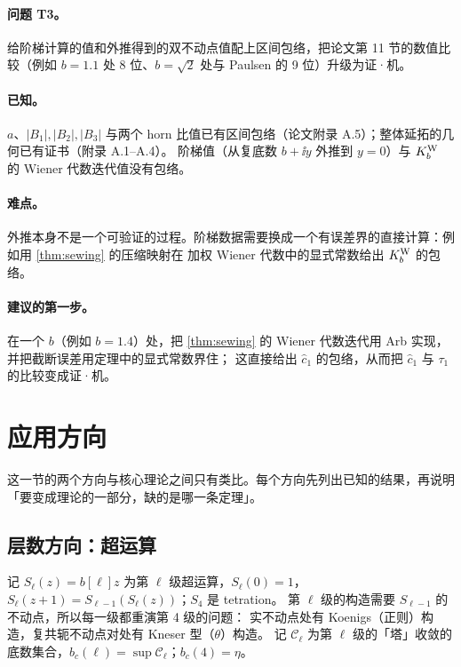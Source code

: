 \paragraph{问题 T3。}给阶梯计算的值和外推得到的双不动点值配上区间包络，把论文第 11 节的数值比较（例如 $b=1.1$ 处 8 位、$b=\sqrt2$ 处与 Paulsen 的 9 位）升级为证·机。

\paragraph{已知。}$a$、$|B_1|,|B_2|,|B_3|$ 与两个 horn 比值已有区间包络（论文附录 A.5）；整体延拓的几何已有证书（附录 A.1--A.4）。
阶梯值（从复底数 $b+\ii y$ 外推到 $y=0$）与 $K^{\mathrm W}_b$ 的 Wiener 代数迭代值没有包络。

\paragraph{难点。}外推本身不是一个可验证的过程。阶梯数据需要换成一个有误差界的直接计算：例如用 \cref{thm:sewing} 的压缩映射在
加权 Wiener 代数中的显式常数给出 $K^{\mathrm W}_b$ 的包络。

\paragraph{建议的第一步。}在一个 $b$（例如 $b=1.4$）处，把 \cref{thm:sewing} 的 Wiener 代数迭代用 Arb 实现，并把截断误差用定理中的显式常数界住；
这直接给出 $\hat c_1$ 的包络，从而把 $\hat c_1$ 与 $\tau_1$ 的比较变成证·机。

\section{应用方向}\label{ch12:sec:applications}

这一节的两个方向与核心理论之间只有类比。每个方向先列出已知的结果，再说明「要变成理论的一部分，缺的是哪一条定理」。

\subsection{层数方向：超运算}\label{ch12:sec:rank}

记 $S_\ell(z)=b[\ell]z$ 为第 $\ell$ 级超运算，$S_\ell(0)=1$，$S_\ell(z+1)=S_{\ell-1}(S_\ell(z))$；$S_4$ 是 tetration。
第 $\ell$ 级的构造需要 $S_{\ell-1}$ 的不动点，所以每一级都重演第 4 级的问题：
实不动点处有 Koenigs（正则）构造，复共轭不动点对处有 Kneser 型（$\theta$）构造。
记 $\mathcal C_\ell$ 为第 $\ell$ 级的「塔」收敛的底数集合，$b_c(\ell)=\sup\mathcal C_\ell$；$b_c(4)=\eta$。

